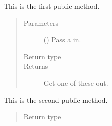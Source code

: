 \documentclass[letterpaper,10pt,english]{sphinxmanual}
\begin{document}
\begin{fulllineitems}

\begin{fulllineitems}
\label{\detokenize{_autosummary/planetscope.mysubpackage.mymodule3.myClass3:planetscope.mysubpackage.mymodule3.myClass3.myMethod1}}
\sphinxAtStartPar
This is the first public method.
\begin{quote}\begin{description}
\item[{Parameters}] \leavevmode
\sphinxAtStartPar
{} () \textendash{} Pass a  in.

\item[{Return type}] \leavevmode
\sphinxAtStartPar
{}

\item[{Returns}] \leavevmode
\sphinxAtStartPar
Get one of these out.

\end{description}\end{quote}

\end{fulllineitems}


\begin{fulllineitems}
\label{\detokenize{_autosummary/planetscope.mysubpackage.mymodule3.myClass3:planetscope.mysubpackage.mymodule3.myClass3.myMethod2}}
\sphinxAtStartPar
This is the second public method.
\begin{quote}\begin{description}
\item[{Return type}] \leavevmode
\sphinxAtStartPar
{}

\end{description}\end{quote}

\end{fulllineitems}


\end{fulllineitems}
\end{document}
